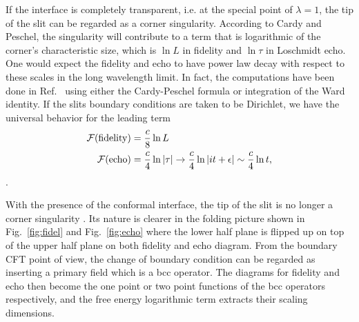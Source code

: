 If the interface is completely transparent, i.e. at the special point of $\lambda = 1$, the tip of the slit can be regarded as a corner singularity. According to Cardy and Peschel\cite{cardy_finite-size_1988}, the singularity will contribute to a term that is logarithmic of the corner's characteristic size, which is $\ln L$ in fidelity and $\ln \tau$ in Loschmidt echo. One would expect the fidelity and echo to have power law decay with respect to these scales in the long wavelength limit. In fact, the computations have been done in Ref.~ using either the Cardy-Peschel formula or integration of the Ward identity. If the slits boundary conditions are taken to be Dirichlet, we have the universal behavior for the leading term \cite{stephan_logarithmic_2013,stephan_local_2011}
\begin{equation}
\label{eq:full-pass}
\begin{aligned}
  \mathcal{F}({\rm fidelity}) &=  \frac{c}{8} \ln L \\
 \mathcal{F}( {\rm echo} )  &= \frac{c}{4} \ln |\tau| \rightarrow \frac{c}{4} \ln |it + \epsilon|   \sim \frac{c}{4}\ln t ,
\end{aligned}
\end{equation}
.

With the presence of the conformal interface, the tip of the slit is no longer a {\color{red}corner singularity\cite{cardy_finite-size_1988}} . Its nature is clearer in the folding picture shown in Fig.~\ref{fig:fidel} and Fig.~\ref{fig:echo} where the lower half plane is flipped up on top of the upper half plane on both fidelity and echo diagram. From the boundary CFT point of view, the change of boundary condition can be regarded as inserting a primary field which is a bcc operator. The diagrams for fidelity and echo then become the one point or two point functions of the bcc operators respectively, and the free energy logarithmic term extracts their scaling dimensions. 


